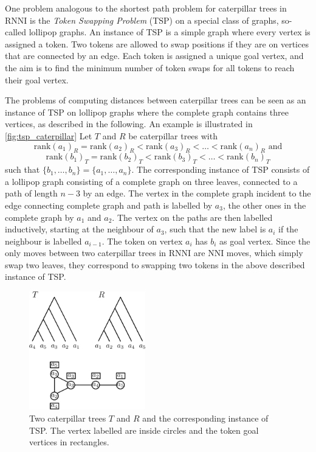 \documentclass[11pt]{amsart}
\newcommand{\rnni}{\mathrm{RNNI}}
\newcommand{\rank}{\mathrm{rank}}
\newcommand{\nni}{\mathrm{NNI}}
\begin{document}
One problem analogous to the shortest path problem for caterpillar trees in $\rnni$ is the \emph{Token Swapping Problem} (TSP) \autocite{Kawahara2017-ey} on a special class of graphs, so-called lollipop graphs.
An instance of TSP is a simple graph where every vertex is assigned a token.
Two tokens are allowed to swap positions if they are on vertices that are connected by an edge.
Each token is assigned a unique goal vertex, and the aim is to find the minimum number of token swaps for all tokens to reach their goal vertex.

The problems of computing distances between caterpillar trees can be seen as an instance of TSP on lollipop graphs where the complete graph contains three vertices, as described in the following.
An example is illustrated in \autoref{fig:tsp_caterpillar}
Let $T$ and $R$ be caterpillar trees with
\[\rank(a_1)_R = \rank(a_2)_R < \rank(a_3)_R < \ldots < \rank(a_n)_R \text{ and}\]
\[\rank(b_1)_T = \rank(b_2)_T < \rank(b_3)_T < \ldots < \rank(b_n)_T\]
such that $\{b_1, \ldots, b_n\} = \{a_1, \ldots, a_n\}$.
The corresponding instance of TSP consists of a lollipop graph consisting of a complete graph on three leaves, connected to a path of length $n-3$ by an edge.
The vertex in the complete graph incident to the edge connecting complete graph and path is labelled by $a_3$, the other ones in the complete graph by $a_1$ and $a_2$.
The vertex on the paths are then labelled inductively, starting at the neighbour of $a_3$, such that the new label is $a_i$ if the neighbour is labelled $a_{i-1}$.
The token on vertex $a_i$ has $b_i$ as goal vertex.
Since the only moves between two caterpillar trees in $\rnni$ are $\nni$ moves, which simply swap two leaves, they correspond to swapping two tokens in the above described instance of TSP.

\begin{figure}[ht]
	\includegraphics[width=0.45\textwidth]{tsp_caterpillar.eps}
	\caption{Two caterpillar trees $T$ and $R$ and the corresponding instance of TSP.
	The vertex labelled are inside circles and the token goal vertices in rectangles.}
	\label{fig:tsp_caterpillar}
\end{figure}
\end{document}
